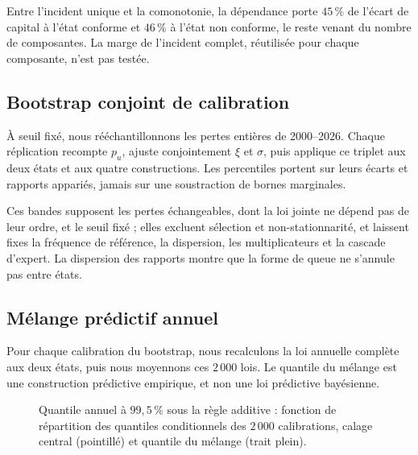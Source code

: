 Entre l'incident unique et la comonotonie, la dépendance porte $45\,\%$ de
l'écart de capital à l'état conforme et $46\,\%$ à l'état non conforme, le reste venant du nombre de
composantes. La marge de l'incident complet, réutilisée pour chaque composante, n'est pas testée.

\subsection{Bootstrap conjoint de calibration}
\label{sec:institut-bootstrap-joint}

À seuil fixé, nous rééchantillonnons les pertes entières de 2000--2026.
Chaque réplication recompte $p_u$, ajuste conjointement $\xi$ et $\sigma$, puis
applique ce triplet aux deux états et aux quatre constructions. Les percentiles
portent sur leurs écarts et rapports appariés, jamais sur une soustraction de bornes marginales.



Ces bandes supposent les pertes échangeables, dont la loi jointe ne dépend pas de leur ordre, et le seuil fixé ; elles excluent sélection et
non-stationnarité, et laissent fixes la fréquence de référence, la dispersion, les multiplicateurs et la
cascade d'expert. La dispersion des rapports montre que la forme de queue ne s'annule pas entre états.

\subsection{Mélange prédictif annuel}
\label{sec:institut-melange-predictif}

Pour chaque calibration du bootstrap, nous recalculons la loi annuelle complète aux deux
états, puis nous moyennons ces $2\,000$ lois. Le quantile du mélange est une construction
prédictive empirique, et non une loi prédictive bayésienne.



\begin{figure}[htbp]
  \centering
  \caption{Quantile annuel à $99{,}5\,\%$ sous la règle additive : fonction de répartition
  des quantiles conditionnels des $2\,000$ calibrations, calage central (pointillé) et
  quantile du mélange (trait plein).}
  \label{fig:melange-predictif}
\end{figure}


